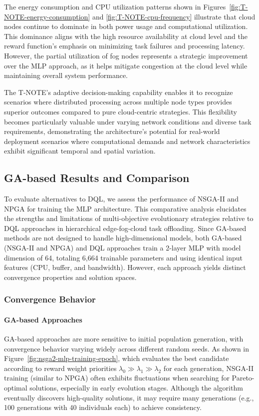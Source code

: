 \documentclass[preprint,3p,authoryear]{elsarticle}
\begin{document}
The energy consumption and CPU utilization patterns shown in Figures~\ref{fig:T-NOTE-energy-consumption} and \ref{fig:T-NOTE-cpu-frequency} illustrate that cloud nodes continue to dominate in both power usage and computational utilization. This dominance aligns with the high resource availability at cloud level and the reward function's emphasis on minimizing task failures and processing latency. However, the partial utilization of fog nodes represents a strategic improvement over the MLP approach, as it helps mitigate congestion at the cloud level while maintaining overall system performance.

The T-NOTE's adaptive decision-making capability enables it to recognize scenarios where distributed processing across multiple node types provides superior outcomes compared to pure cloud-centric strategies. This flexibility becomes particularly valuable under varying network conditions and diverse task requirements, demonstrating the architecture's potential for real-world deployment scenarios where computational demands and network characteristics exhibit significant temporal and spatial variation.




\subsection{GA-based Results and Comparison}\label{subsec:ga_vs_DQL}

To evaluate alternatives to DQL, we assess the performance of NSGA-II and NPGA for training the MLP architecture. This comparative analysis elucidates the strengths and limitations of multi-objective evolutionary strategies relative to DQL approaches in hierarchical edge-fog-cloud task offloading. Since GA-based methods are not designed to handle high-dimensional models, both GA-based (NSGA-II and NPGA) and DQL approaches train a 2-layer MLP with model dimension of 64, totaling 6,664 trainable parameters and using identical input features (CPU, buffer, and bandwidth). However, each approach yields distinct convergence properties and solution spaces.

\subsubsection{Convergence Behavior}

\paragraph{GA-based Approaches}
GA-based approaches are more sensitive to initial population generation, with convergence behavior varying widely across different random seeds. As shown in Figure~\ref{fig:nsga2-mlp-training-epoch}, which evaluates the best candidate according to reward weight priorities \(\lambda_0 \gg \lambda_1 \gg \lambda_2\) for each generation, NSGA-II training (similar to NPGA) often exhibits fluctuations when searching for Pareto-optimal solutions, especially in early evolution stages. Although the algorithm eventually discovers high-quality solutions, it may require many generations (e.g., 100 generations with 40 individuals each) to achieve consistency.
\end{document}
